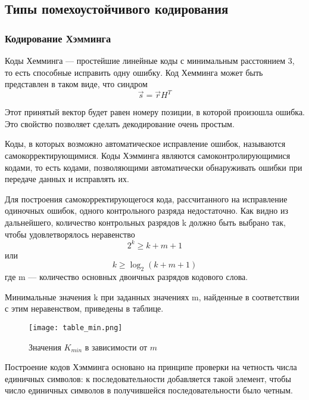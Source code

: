 \subsection{Типы помехоустойчивого кодирования}
\subsubsection{Кодирование Хэмминга}
Коды Хемминга — простейшие линейные коды с минимальным расстоянием 3, то есть способные исправить одну ошибку. Код Хемминга может быть представлен в таком виде, что синдром
\begin{equation}
\vec{s} = \vec{r} H^T
\end{equation}

Этот принятый вектор будет равен номеру позиции, в которой произошла ошибка. Это свойство позволяет сделать декодирование очень простым.

Коды, в которых возможно автоматическое исправление ошибок, называются самокорректирующимися. Коды Хэмминга являются самоконтролирующимися кодами, то есть кодами, позволяющими автоматически обнаруживать ошибки при передаче данных и исправлять их.

Для построения самокорректирующегося кода, рассчитанного на исправление одиночных ошибок, одного контрольного разряда недостаточно. Как видно из дальнейшего, количество контрольных разрядов k должно быть выбрано так, чтобы удовлетворялось неравенство 
\begin{equation}
2^{k}\geq k+m+1
\end{equation}
или  
\begin{equation}
k \geq \log _{2}(k+m+1) 
\end{equation}
где m — количество основных двоичных разрядов кодового слова.

Минимальные значения k при заданных значениях m, найденные в соответствии с этим неравенством, приведены в таблице.
\begin{figure}[H]
    \begin{center}
        \texttt{[image: table\_min.png]}
        \caption{Значения $K_{min}$ в зависимости от $m$} %
        \label{table_min} %
    \end{center}
\end{figure}

Построение кодов Хэмминга основано на принципе проверки на четность числа единичных символов: к последовательности добавляется такой элемент, чтобы число единичных символов в получившейся последовательности было четным.

